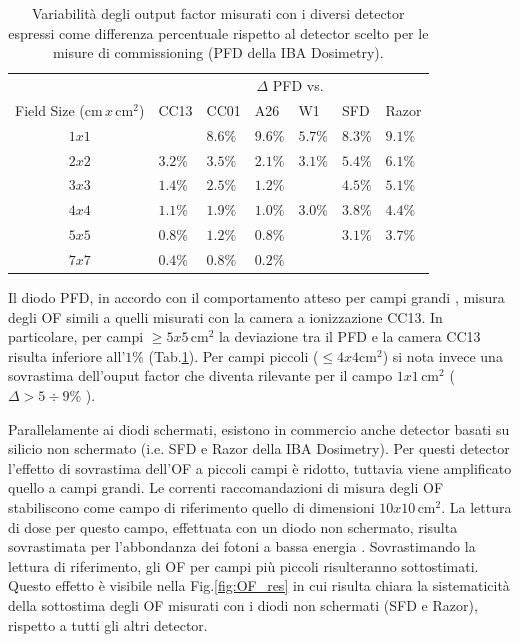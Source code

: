 \begin{table}
\centering
{}
\begin{tabular}{cllllll}
\toprule
  & \multicolumn{6}{c}{$\Delta$ PFD vs.}\\
  \cmidrule{2-7}
 
Field Size (cm$\,x\,$cm$^2$) & CC13 & CC01 & A26 & W1 & SFD & Razor\\
\midrule
$1x1$ &        & $8.6\%$ & $9.6\%$ & $5.7\%$ & $8.3\%$ & $9.1\%$\\
$2x2$ & $3.2\%$ & $3.5\%$ & $2.1\%$ & $3.1\%$ & $5.4\%$ & $6.1\%$\\
$3x3$ & $1.4\%$ & $2.5\%$ & $1.2\%$ &  & $4.5\%$ & $5.1\%$ \\
$4x4$ & $1.1\%$ & $1.9\%$ & $1.0\%$ & $3.0\%$ & $3.8\%$ & $4.4\%$ \\
$5x5$ & $0.8\%$ & $1.2\%$ & $0.8\%$	&         & $3.1\%$ & $3.7\%$ \\
$7x7$ & $0.4\%$ & $0.8\%$ & $0.2\%$	&         &         &         \\
\bottomrule
\end{tabular}
\caption{Variabilità degli output factor misurati con i diversi detector espressi come differenza percentuale rispetto al detector scelto per le misure di commissioning (PFD della IBA Dosimetry).}
\label{tab:delta_OF}
\end{table}

Il diodo PFD, in accordo con il comportamento atteso per campi grandi \cite{Griessbach2005}, misura degli OF simili a quelli misurati con la camera a ionizzazione CC13. In particolare, per campi $\geq 5x5\,$cm$^2$ la deviazione tra il PFD e la camera CC13 risulta inferiore all'$1\%$ (Tab.\ref{tab:delta_OF}). Per campi piccoli ($\leq 4x4$cm$^2$) si nota invece una sovrastima dell'ouput factor che diventa rilevante per il campo $1x1\,$cm$^2$ ($\Delta > 5\div9\%$ ).

Parallelamente ai diodi schermati, esistono in commercio anche detector basati su silicio non schermato (i.e. SFD e Razor della IBA Dosimetry). Per questi detector l'effetto di sovrastima dell'OF a piccoli campi è ridotto, tuttavia viene amplificato quello a campi grandi. Le correnti raccomandazioni di misura degli OF \cite{Andreo2006,RaySearchLaboratories2014} stabiliscono come campo di riferimento quello di dimensioni $10x10\,$cm$^2$. La lettura di dose per questo campo, effettuata con un diodo non schermato, risulta sovrastimata per l'abbondanza dei fotoni a bassa energia \cite{Griessbach2005}. Sovrastimando la lettura di riferimento, gli OF per campi più piccoli risulteranno sottostimati. Questo effetto è visibile nella Fig.\ref{fig:OF_res} in cui risulta chiara la sistematicità della sottostima degli OF misurati con i diodi non schermati (SFD e Razor), rispetto a tutti gli altri detector.

